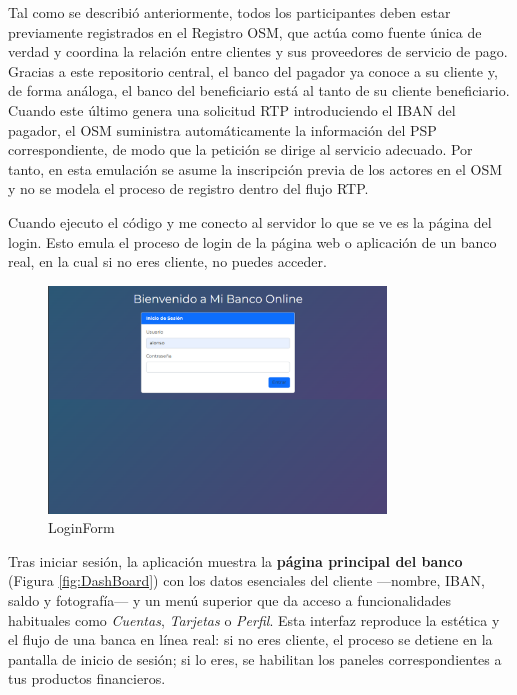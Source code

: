 Tal como se describió anteriormente, todos los participantes deben estar previamente registrados en el Registro OSM, que actúa como fuente única de verdad y coordina la relación entre clientes y sus proveedores de servicio de pago. Gracias a este repositorio central, el banco del pagador ya conoce a su cliente y, de forma análoga, el banco del beneficiario está al tanto de su cliente beneficiario. Cuando este último genera una solicitud RTP introduciendo el IBAN del pagador, el OSM suministra automáticamente la información del PSP correspondiente, de modo que la petición se dirige al servicio adecuado. Por tanto, en esta emulación se asume la inscripción previa de los actores en el OSM y no se modela el proceso de registro dentro del flujo RTP.

Cuando ejecuto el código y me conecto al servidor lo que se ve es la página del login. Esto emula el proceso de login de la página web o aplicación de un banco real, en la cual si no eres cliente, no puedes acceder.

\begin{figure}[H]
  \centering
  \includegraphics[width=0.8\textwidth]{Imagenes/LoginForm.png}
  \caption{LoginForm}
  \label{fig:Login}
\end{figure}

Tras iniciar sesión, la aplicación muestra la \textbf{página principal del banco} (Figura \ref{fig:DashBoard}) con los datos esenciales del cliente —nombre, IBAN, saldo y fotografía— y un menú superior que da acceso a funcionalidades habituales como \emph{Cuentas}, \emph{Tarjetas} o \emph{Perfil}. Esta interfaz reproduce la estética y el flujo de una banca en línea real: si no eres cliente, el proceso se detiene en la pantalla de inicio de sesión; si lo eres, se habilitan los paneles correspondientes a tus productos financieros.

